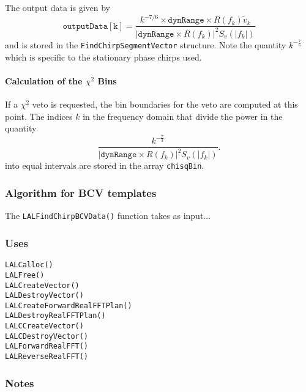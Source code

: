 The output data is given by
\begin{equation}
\mathtt{outputData[k]} =
\frac{k^{-7/6} \times \mathtt{dynRange} \times R(f_k)\tilde{v}_k}
{\left|\mathtt{dynRange} \times R(f_k)\right|^2 S_v(|f_k|)}
\end{equation}
and is stored in the \texttt{FindChirpSegmentVector} structure. Note the
quantity $k^{-\frac{7}{6}}$ which is specific to the stationary phase chirps
used.

\paragraph*{Calculation of the $\chi^2$ Bins}

If a $\chi^2$ veto is requested, the bin boundaries for the veto are computed
at this point. The indices $k$ in the frequency domain that divide the power
in the quantity
\begin{equation}
\frac{k^{-\frac{7}{3}}}
{\left|\mathtt{dynRange}\times R(f_k)\right|^2 S_v(|f_k|)}.
\end{equation}
into equal intervals are stored in the array \texttt{chisqBin}.

\subsubsection*{Algorithm for BCV templates}

The \texttt{LALFindChirpBCVData()} function takes as input...

\subsubsection*{Uses}
\begin{verbatim}
LALCalloc()
LALFree()
LALCreateVector()
LALDestroyVector()
LALCreateForwardRealFFTPlan()
LALDestroyRealFFTPlan()
LALCCreateVector()
LALCDestroyVector()
LALForwardRealFFT()
LALReverseRealFFT()
\end{verbatim}

\subsubsection*{Notes}

